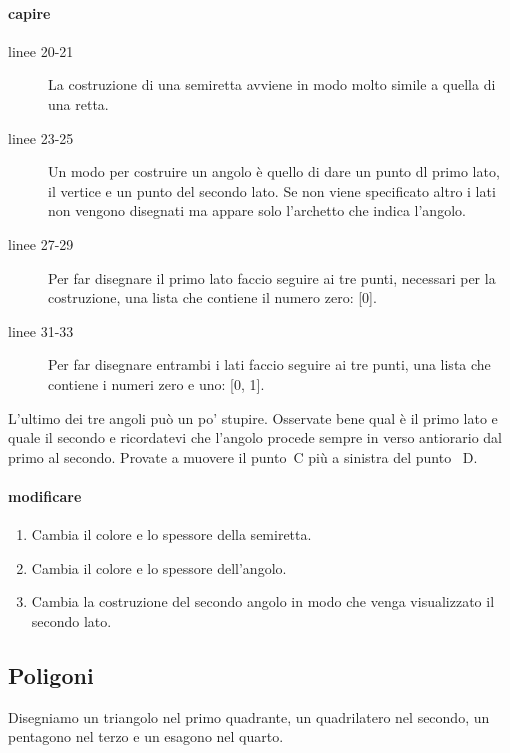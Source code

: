 

\paragraph{capire}

\begin{description}
 \item [linee 20-21]
La costruzione di una semiretta avviene in modo molto simile a quella di una 
retta.
 \item [linee 23-25]
Un modo per costruire un angolo è quello di dare un punto dl primo lato, il 
vertice e un punto del secondo lato. Se non viene specificato altro i lati non 
vengono disegnati ma appare solo l'archetto che indica l'angolo.
 \item [linee 27-29]
Per far disegnare il primo lato faccio seguire ai tre punti, necessari per la 
costruzione, una lista che contiene il numero zero: [0].
 \item [linee 31-33]
Per far disegnare entrambi i lati faccio seguire ai tre punti, una lista che 
contiene i numeri zero e uno: [0, 1].
\end{description}

\begin{osservazione}
L'ultimo dei tre angoli può un po' stupire. Osservate bene qual è il primo lato 
e quale il secondo e ricordatevi che l'angolo procede sempre in verso 
antiorario dal primo al secondo. Provate a muovere il punto~C più a sinistra 
del punto ~D.
\end{osservazione}

\paragraph{modificare}
\begin{enumerate} [noitemsep]
 \item Cambia il colore e lo spessore della semiretta.
 \item Cambia il colore e lo spessore dell'angolo.
 \item Cambia la costruzione del secondo angolo in modo che venga visualizzato 
il secondo lato.
\end{enumerate}

\subsection{Poligoni}
\label{subsec:geo_int_poligoni}
Disegniamo un triangolo nel primo quadrante, un quadrilatero nel secondo, un 
pentagono nel terzo e un esagono nel quarto.

